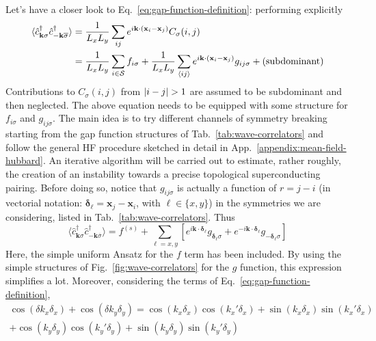 Let's have a closer look to Eq.~\eqref{eq:gap-function-definition}: performing explicitly
\[
\begin{aligned}
	\langle 
		\hat c_{\mathbf{k}\sigma}^\dagger \hat c_{-\mathbf{k} \overline{\sigma}}^\dagger
	\rangle &= \frac{1}{L_x L_y} \sum_{ij} e^{i \mathbf{k} \cdot (\mathbf{x}_i - \mathbf{x}_j)} C_\sigma(i,j) \\
	&= \frac{1}{L_x L_y} \sum_{i \in \mathcal{S}} f_{i\sigma} + \frac{1}{L_x L_y} \sum_{\ev{ij}} e^{i \mathbf{k} \cdot (\mathbf{x}_i - \mathbf{x}_j)} g_{ij\sigma} + (\text{subdominant})
\end{aligned}
\]
Contributions to $C_\sigma(i,j)$ from $\abs{i-j}>1$ are assumed to be subdominant and then neglected. The above equation needs to be equipped with some structure for $f_{i\sigma}$ and $g_{ij\sigma}$. The main idea is to try different channels of symmetry breaking starting from the gap function structures of Tab.~\ref{tab:wave-correlators} and follow the general HF procedure sketched in detail in App.~\ref{appendix:mean-field-hubbard}. An iterative algorithm will be carried out to estimate, rather roughly, the creation of an instability towards a precise topological superconducting pairing. Before doing so, notice that $g_{ij\sigma}$ is actually a function of $r = j-i$ (in vectorial notation: $\bm{\delta}_\ell = \mathbf{x}_j - \mathbf{x}_i$, with $\ell \in \lbrace x,y \rbrace$) in the symmetries we are considering, listed in Tab.~\ref{tab:wave-correlators}. Thus
\begin{equation}\label{eq:correlation-fourier}
	\langle 
		\hat c_{\mathbf{k}\sigma}^\dagger \hat c_{-\mathbf{k} \overline{\sigma}}^\dagger
	\rangle = f^{(s)} + \sum_{\ell = x,y} \left[
		e^{i \mathbf{k} \cdot \bm{\delta_\ell}} g_{\bm{\delta}_\ell\sigma} + e^{- i \mathbf{k} \cdot \bm{\delta_\ell}} g_{-\bm{\delta}_\ell\sigma}
	\right]
\end{equation}
Here, the simple uniform Ansatz for the $f$ term has been included. By using the simple structures of Fig.~\ref{fig:wave-correlators} for the $g$ function, this expression simplifies a lot. Moreover, considering the terms of Eq.~\eqref{eq:gap-function-definition},
\begin{multline*}
	\cos \left( \delta k_x \delta_x \right)	+ \cos \left( \delta k_y \delta_y \right) = \cos \left( k_x \delta_x \right) \cos \left( k_x' \delta_x \right) + \sin \left( k_x \delta_x \right) \sin \left( k_x' \delta_x \right) \\ 
	+ \cos \left( k_y \delta_y \right) \cos \left( k_y' \delta_y \right) + \sin \left( k_y \delta_y \right) \sin \left( k_y' \delta_y \right)
\end{multline*}
